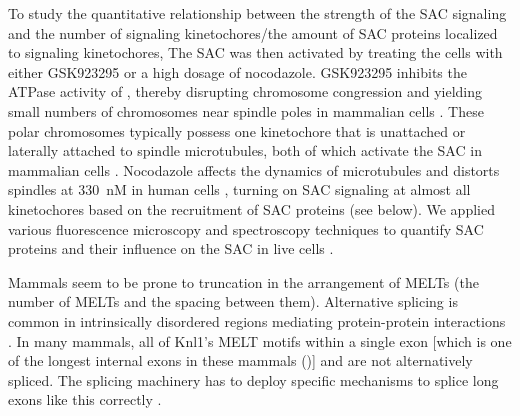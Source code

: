To study the quantitative relationship between the strength of the SAC signaling and the number of signaling kinetochores/the amount of SAC proteins localized to signaling kinetochores, The SAC was then activated by treating the cells with either GSK923295 or a high dosage of nocodazole. GSK923295 inhibits the ATPase activity of , thereby disrupting chromosome congression and yielding small numbers of chromosomes near spindle poles in mammalian cells \cite{GSK923295}.
These polar chromosomes typically possess one kinetochore that is unattached or laterally attached to spindle microtubules, both of which activate the SAC in mammalian cells \cite{GSK923295MonastrolCotreatment,GSK923295LateralAttachmentEM,LateralAttachmentSAC}.
Nocodazole affects the dynamics of microtubules and distorts spindles at \SI{330}{nM} in human cells \cite{TypeIIISpindle_330nMNoc, RPE1+Noc}, turning on SAC signaling at almost all kinetochores based on the recruitment of SAC proteins (see below). We applied various fluorescence microscopy and spectroscopy techniques to quantify SAC proteins and their influence on the SAC in live cells \cite{eSAC}. %


Mammals seem to be prone to truncation in the arrangement of MELTs (the number of MELTs and the spacing between them). Alternative splicing is common in intrinsically disordered regions mediating protein-protein interactions \cite{DisorderedRegionsAlternativeSplicing}. In many mammals, all of Knl1's MELT motifs within a single exon [which is one of the longest internal exons in these mammals ()] and are not alternatively spliced. The splicing machinery has to deploy specific mechanisms to splice long exons like this correctly \cite{InternalExon}.

